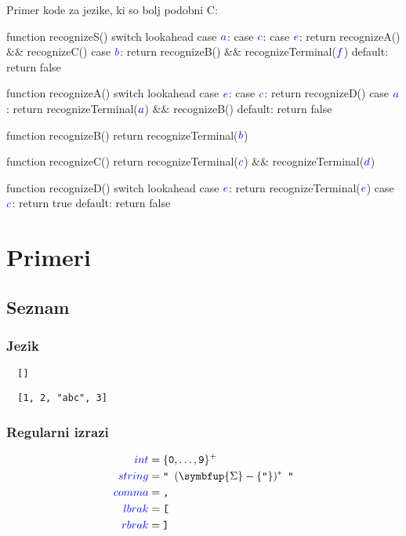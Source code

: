 \documentclass{article}
\newcommand{\Symbol}[1]{\textcolor{blue}{#1}}
\newcommand{\Alphabet}{\symbfup{\Sigma}}
\newcommand{\Char}[1]{\texttt{#1}}
\newcommand{\Seq}{{\ \,}}
\newcommand{\Kleene}[1]{#1^\ast}
\newcommand{\KleenePlus}[1]{#1^+}
\begin{document}
\newpage
Primer kode za jezike, ki so bolj podobni C:
\begin{algorithm}
  function recognizeS()
    switch lookahead
      case $\Symbol{a}$:
      case $\Symbol{c}$:
      case $\Symbol{e}$:
        return recognizeA() $\&\&$ recognizeC()
      case $\Symbol{b}$:
        return recognizeB() $\&\&$ recognizeTerminal($\Symbol{f}$)
      default:
        return false

  function recognizeA()
     switch lookahead
      case $\Symbol{e}$:
      case $\Symbol{c}$:
        return recognizeD()
      case $\Symbol{a}$:
        return recognizeTerminal($\Symbol{a}$) $\&\&$ recognizeB()
      default:
        return false

  function recognizeB()
    return recognizeTerminal($\Symbol{b}$)

  function recognizeC()
    return recognizeTerminal($\Symbol{c}$) $\&\&$ recognizeTerminal($\Symbol{d}$)

  function recognizeD()
    switch lookahead
      case $\Symbol{e}$:
        return recognizeTerminal($\Symbol{e}$)
      case $\Symbol{c}$:
        return true
      default:
        return false
\end{algorithm}

\section{Primeri}


\subsection{Seznam}

\subsubsection*{Jezik}
\begin{verbatim}
  []
\end{verbatim}
\begin{verbatim}
  [1, 2, "abc", 3]
\end{verbatim}

\subsubsection*{Regularni izrazi}
\begin{equation*}
  \begin{aligned}
    \Symbol{int} &= \KleenePlus{\{\Char{0}, \dots, \Char{9}\}}\\
    \Symbol{string} &= \Char{"} \Seq \Kleene{(\Alphabet - \{\Char{"}\})} \Seq \Char{"}\\
    \Symbol{comma} &= \Char{,}\\
    \Symbol{lbrak} &= \Char{[}\\
    \Symbol{rbrak} &= \Char{]}\\
  \end{aligned}
\end{equation*}
\end{document}

